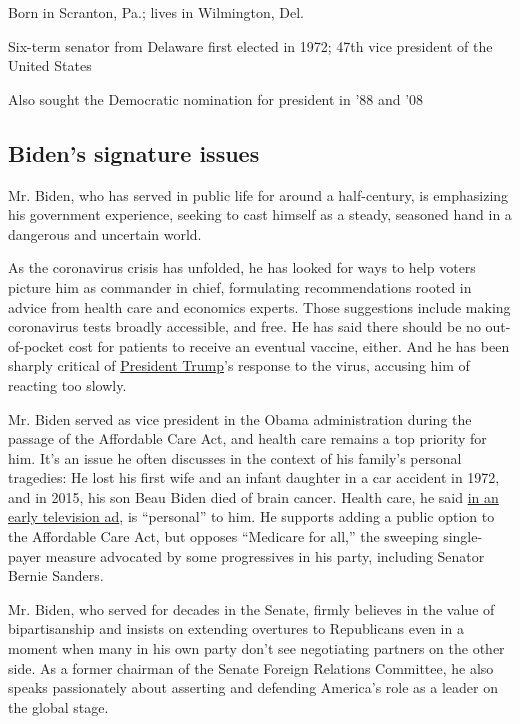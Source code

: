 Born in Scranton, Pa.; lives in Wilmington, Del.

Six-term senator from Delaware first elected in 1972; 47th vice
president of the United States

Also sought the Democratic nomination for president in '88 and '08

\hypertarget{bidens-signature-issues}{%
\subsection{Biden's signature issues}\label{bidens-signature-issues}}

Mr. Biden, who has served in public life for around a half-century, is
emphasizing his government experience, seeking to cast himself as a
steady, seasoned hand in a dangerous and uncertain world.

As the coronavirus crisis has unfolded, he has looked for ways to help
voters picture him as commander in chief, formulating recommendations
rooted in advice from health care and economics experts. Those
suggestions include making coronavirus tests broadly accessible, and
free. He has said there should be no out-of-pocket cost for patients to
receive an eventual vaccine, either. And he has been sharply critical of
\href{https://www.nytimes.com/interactive/2020/us/elections/donald-trump.html}{President
Trump}'s response to the virus, accusing him of reacting too slowly.

Mr. Biden served as vice president in the Obama administration during
the passage of the Affordable Care Act, and health care remains a top
priority for him. It's an issue he often discusses in the context of his
family's personal tragedies: He lost his first wife and an infant
daughter in a car accident in 1972, and in 2015, his son Beau Biden died
of brain cancer. Health care, he said
\href{https://www.nytimes.com/2019/08/27/us/politics/joe-biden-ad-personal.html}{in
an early television ad}, is ``personal'' to him. He supports adding a
public option to the Affordable Care Act, but opposes ``Medicare for
all,'' the sweeping single-payer measure advocated by some progressives
in his party, including Senator Bernie Sanders.

Mr. Biden, who served for decades in the Senate, firmly believes in the
value of bipartisanship and insists on extending overtures to
Republicans even in a moment when many in his own party don't see
negotiating partners on the other side. As a former chairman of the
Senate Foreign Relations Committee, he also speaks passionately about
asserting and defending America's role as a leader on the global stage.

